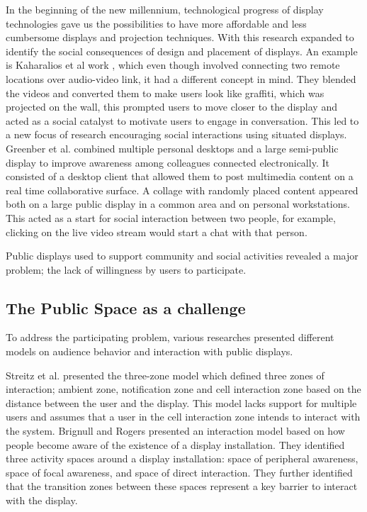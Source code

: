 In the beginning of the new millennium, technological progress of display technologies gave us the possibilities to have more affordable and less cumbersome displays and projection techniques. With this research expanded to identify the social consequences of design and placement of displays. An example is Kaharalios et al work \cite{Karahalios:2004}, which even though involved connecting two remote locations over audio-video link, it had a different concept in mind. They blended the videos and converted them to make users look like graffiti, which was projected on the wall, this prompted users to move closer to the display and acted as a social catalyst to motivate users to engage in conversation. This led to a new focus of research encouraging social interactions using situated displays. Greenber et al.\cite{Greenberg:2001} combined multiple personal desktops and a
large semi-public display to improve awareness among colleagues  connected electronically. It consisted of a desktop client that allowed them to post multimedia content  on a real time collaborative surface. A collage with randomly placed
content appeared both on a large public display in a common area and on personal workstations. This acted as a start for social interaction between two people, for example, clicking on the live video stream would start a chat with that person.

Public displays used to support community and social activities revealed a major problem; the lack of willingness by users to participate.
\subsection{The Public Space as a challenge}
To address the participating problem, various researches presented different models on audience behavior and interaction with public displays.

 Streitz et al.\cite{Streitz:2003} presented the three-zone model which defined three zones of interaction; ambient zone, notification zone and cell interaction zone based on the distance between the user and the display. This model lacks support for multiple users and assumes that a user in the cell interaction zone intends to interact with the system. Brignull and Rogers \cite{Brignull:2003} presented an interaction model based on how people become aware of the existence of a display installation. They identified three activity spaces around a display installation: space of peripheral awareness, space of focal  awareness, and space of direct interaction. They further identified that the transition zones between these spaces represent a key barrier to interact with the display.

